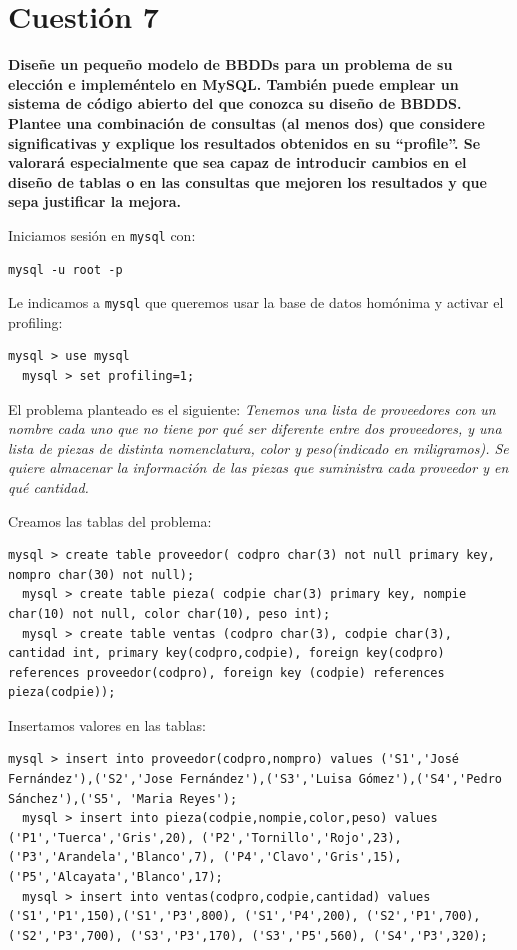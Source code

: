 \documentclass[a4paper,10pt]{article}
\newenvironment{answer}{%
\begin{list}{}{%
}%
\item[]}{\end{list}}
\begin{document}
\section{Cuestión 7}
\textbf{Diseñe un pequeño modelo de BBDDs para un problema de su elección e impleméntelo en MySQL. También puede emplear un sistema
de código abierto del que conozca su diseño de BBDDS. Plantee una combinación de consultas (al menos dos) que considere significativas
y explique los resultados obtenidos en su ``profile''. Se valorará especialmente que sea capaz de introducir cambios en el 
diseño de tablas o en las consultas que mejoren los resultados y que sepa justificar la mejora.}
\begin{answer}
 Iniciamos sesión en \texttt{mysql} con:
 \begin{lstlisting}[style=BashInputStyle]
  mysql -u root -p
 \end{lstlisting}

 Le indicamos a \texttt{mysql} que queremos usar la base de datos homónima y activar el profiling:
  \begin{lstlisting}[style=BashInputStyle]
  mysql > use mysql
  mysql > set profiling=1;
 \end{lstlisting}
 
 El problema planteado es el siguiente: \textit{Tenemos una lista de proveedores con un nombre cada uno que no
 tiene por qué ser diferente entre dos proveedores, y una lista de piezas de distinta nomenclatura, color y peso(indicado
 en miligramos). Se quiere almacenar la información de las piezas que suministra cada proveedor y en qué cantidad.}
 
 Creamos las tablas del problema:
 \begin{lstlisting}[style=BashInputStyle]
  mysql > create table proveedor( codpro char(3) not null primary key, nompro char(30) not null);
  mysql > create table pieza( codpie char(3) primary key, nompie char(10) not null, color char(10), peso int);
  mysql > create table ventas (codpro char(3), codpie char(3), cantidad int, primary key(codpro,codpie), foreign key(codpro) references proveedor(codpro), foreign key (codpie) references pieza(codpie));
 \end{lstlisting}
 
 Insertamos valores en las tablas:
 \begin{lstlisting}[style=BashInputStyle]
  mysql > insert into proveedor(codpro,nompro) values ('S1','José Fernández'),('S2','Jose Fernández'),('S3','Luisa Gómez'),('S4','Pedro Sánchez'),('S5', 'Maria Reyes');
  mysql > insert into pieza(codpie,nompie,color,peso) values ('P1','Tuerca','Gris',20), ('P2','Tornillo','Rojo',23), ('P3','Arandela','Blanco',7), ('P4','Clavo','Gris',15), ('P5','Alcayata','Blanco',17);
  mysql > insert into ventas(codpro,codpie,cantidad) values ('S1','P1',150),('S1','P3',800), ('S1','P4',200), ('S2','P1',700), ('S2','P3',700), ('S3','P3',170), ('S3','P5',560), ('S4','P3',320);
 \end{lstlisting}
 

\end{answer}
\end{document}
